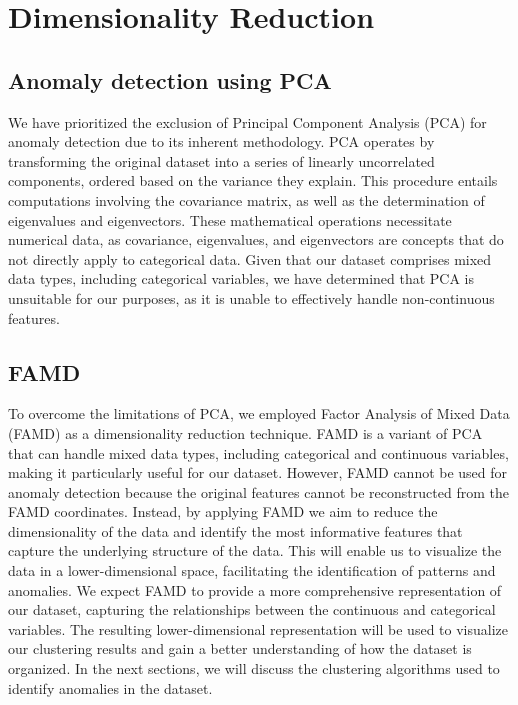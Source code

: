 \documentclass[a4paper]{article}
\begin{document}
\section{Dimensionality Reduction}

\subsection{Anomaly detection using PCA}
We have prioritized the exclusion of Principal Component Analysis (PCA) for anomaly detection due to its inherent methodology. PCA operates by transforming the original dataset into a series of linearly uncorrelated components, ordered based on the variance they explain. This procedure entails computations involving the covariance matrix, as well as the determination of eigenvalues and eigenvectors. These mathematical operations necessitate numerical data, as covariance, eigenvalues, and eigenvectors are concepts that do not directly apply to categorical data. Given that our dataset comprises mixed data types, including categorical variables, we have determined that PCA is unsuitable for our purposes, as it is unable to effectively handle non-continuous features.

\subsection{FAMD}
To overcome the limitations of PCA, we employed Factor Analysis of Mixed Data (FAMD) as a dimensionality reduction technique. FAMD is a variant of PCA that can handle mixed data types, including categorical and continuous variables, making it particularly useful for our dataset. However, FAMD cannot be used for anomaly detection because the original features cannot be reconstructed from the FAMD coordinates.
Instead, by applying FAMD we aim to reduce the dimensionality of the data and identify the most informative features that capture the underlying structure of the data. This will enable us to visualize the data in a lower-dimensional space, facilitating the identification of patterns and anomalies. We expect FAMD to provide a more comprehensive representation of our dataset, capturing the relationships between the continuous and categorical variables. The resulting lower-dimensional representation will be used to visualize our clustering results and gain a better understanding of how the dataset is organized.
In the next sections, we will discuss the clustering algorithms used to identify anomalies in the dataset.
\end{document}
